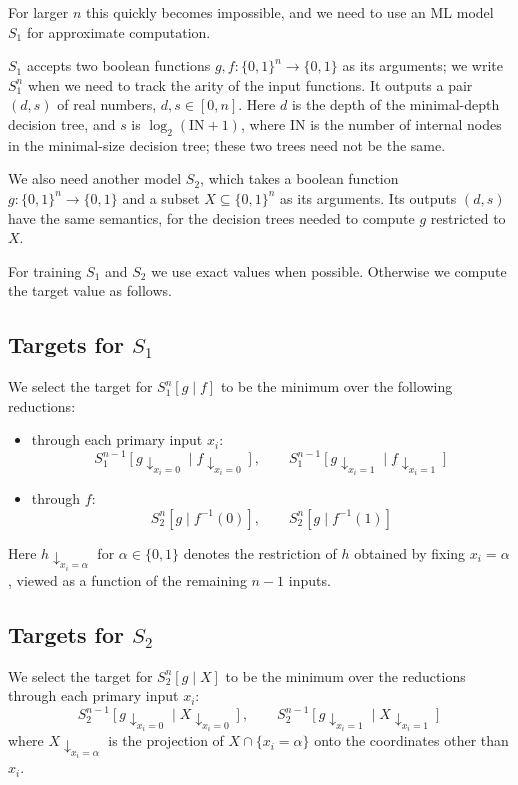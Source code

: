 \documentclass[11pt]{article}
\begin{document}
For larger $n$ this quickly becomes impossible, and we need to use an ML model $S_1$
for approximate computation.

$S_1$ accepts two boolean functions $g, f : \{0,1\}^n \to \{0,1\}$ as its arguments;
we write $S^n_1$ when we need to track the arity of the input functions.
It outputs a pair $(d, s)$ of real numbers, $d, s \in [0, n]$. Here $d$ is the depth
of the minimal-depth decision tree, and $s$ is $\log_2 (\text{IN} + 1)$, where
$\text{IN}$ is the number of internal nodes in the minimal-size decision tree; these
two trees need not be the same.

We also need another model $S_2$, which takes a boolean function $g : \{0,1\}^n \to \{0,1\}$
and a subset $X \subseteq \{0,1\}^n$ as its arguments. Its outputs $(d, s)$ have the
same semantics, for the decision trees needed to compute $g$ restricted to $X$.

For training $S_1$ and $S_2$ we use exact values when possible. Otherwise we compute
the target value as follows.

\subsection{Targets for $S_1$}

We select the target for $S^n_1\left[g \mid f\right]$ to be the minimum over the
following reductions:
\begin{itemize}
    \item through each primary input $x_i$:
        $$
            S^{n-1}_1 \left[g \downarrow_{x_i = 0} \mid f \downarrow_{x_i = 0} \right], \qquad
            S^{n-1}_1 \left[g \downarrow_{x_i = 1} \mid f \downarrow_{x_i = 1} \right]
        $$
    \item through $f$:
        $$
            S^n_2 \left[g \mid f^{-1}(0) \right], \qquad
            S^n_2 \left[g \mid f^{-1}(1) \right]
        $$
\end{itemize}

Here $h \downarrow_{x_i = \alpha}$ for $\alpha \in \{0, 1\}$ denotes the restriction of
$h$ obtained by fixing $x_i = \alpha$, viewed as a function of the remaining $n - 1$
inputs.

\subsection{Targets for $S_2$}

We select the target for $S^n_2\left[g \mid X\right]$ to be the minimum over the
reductions through each primary input $x_i$:
$$
    S^{n-1}_2 \left[g \downarrow_{x_i = 0} \mid X \downarrow_{x_i = 0} \right], \qquad
    S^{n-1}_2 \left[g \downarrow_{x_i = 1} \mid X \downarrow_{x_i = 1} \right]
$$
where $X \downarrow_{x_i = \alpha}$ is the projection of $X \cap \{x_i = \alpha\}$ onto
the coordinates other than $x_i$.



\end{document}
